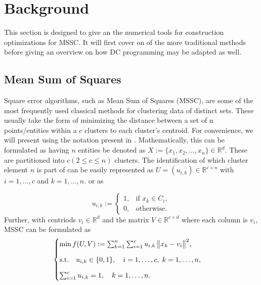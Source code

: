 
\newtheorem{lemma}{Lemma}
\newtheorem{sublemma}{Lemma}[lemma]
\newtheorem{theorem}{Theorem}[section]

\section{Background}
This section is designed to give an the numerical tools for construction optimizations for MSSC. It will first cover on of the more traditional methods before giving an overview on how DC programming may be adapted as well. 


\subsection{Mean Sum of Squares}
Square error algorithms, such as Mean Sum of Squares (MSSC), are some of the most frequently used classical methods for clustering data of distinct sets. These usually take the form of minimizing the distance between a set of n points/entities within a $c$ clusters to each cluster's centroid. For convenience, we will present using the notation present in \cite{an_minimum_2009}. Mathematically, this can be formulated as having $n$ entities be denoted as \(X := \{x_1, x_2, \ldots, x_n\} \in \mathbb{R}^d\). These are partitioned into \(c (2\le c\le n) \) clusters. The identification of which cluster element \(n\) is part of can be easily represented as \(U = (u_{i,k}) \in \mathbb{R}^{c\times n}\) with \(i =1,...,c\) and \(k =1,...,n.\) or as



\[
u_{i,k} :=
\begin{cases}
1, & \text{if } x_k \in C_i,\\
0, & \text{otherwise}.
\end{cases}
\]
\noindent Further, with centriods $v_i \in \mathbb{R}^d$ and  the matrix \(V \in \mathbb{R}^{c\times d}\) where each column is $v_i$, MSSC can be formulated as 
\begin{equation}
\begin{cases}
\min{ f(U,V)}
:=  \sum_{k=1}^n \sum_{i=1}^c u_{i,k} \,\bigl\lVert x_k - v_i\bigr\rVert^2, \\[8pt]
\text{s.t.}\quad
u_{i,k} \in \{0,1\}, 
\quad i = 1,\dots,c,\; k = 1,\dots,n,\\[8pt]
\sum_{i=1}^c u_{i,k} = 1,\quad k = 1,\dots,n.
\end{cases}\\
\label{eq:my_equatio}
\end{equation}

